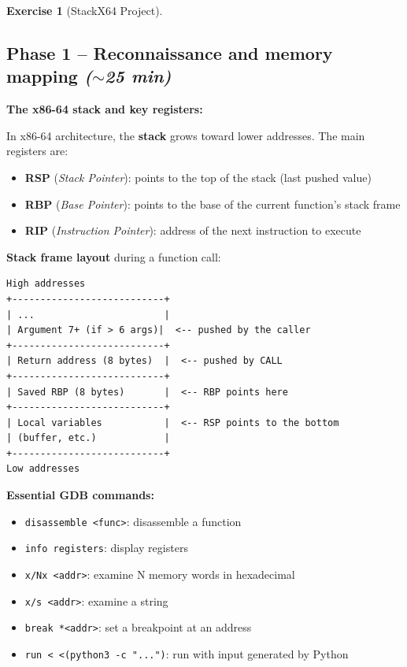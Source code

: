 \documentclass[a4paper,11pt]{article}
\theoremstyle{plain}
\theoremstyle{definition}
\newtheorem{exercice}{Exercise}
\begin{document}
\begin{exercice}[StackX64 Project]$\;$


\subsection*{Phase 1 -- Reconnaissance and memory mapping \hfill\normalfont\textit{($\sim$25 min)}}

\begin{rappel}
\textbf{The x86-64 stack and key registers:}

In x86-64 architecture, the \textbf{stack} grows toward lower addresses. The main registers are:
\begin{itemize}
    \item \textbf{RSP} (\textit{Stack Pointer}): points to the top of the stack (last pushed value)
    \item \textbf{RBP} (\textit{Base Pointer}): points to the base of the current function's stack frame
    \item \textbf{RIP} (\textit{Instruction Pointer}): address of the next instruction to execute
\end{itemize}

\medskip
\textbf{Stack frame layout} during a function call:
\begin{lstlisting}[style=GDBStyle]
High addresses
+---------------------------+
| ...                       |
| Argument 7+ (if > 6 args)|  <-- pushed by the caller
+---------------------------+
| Return address (8 bytes)  |  <-- pushed by CALL
+---------------------------+
| Saved RBP (8 bytes)       |  <-- RBP points here
+---------------------------+
| Local variables           |  <-- RSP points to the bottom
| (buffer, etc.)            |
+---------------------------+
Low addresses
\end{lstlisting}

\medskip
\textbf{Essential GDB commands:}
\begin{itemize}
    \item \texttt{disassemble <func>}: disassemble a function
    \item \texttt{info registers}: display registers
    \item \texttt{x/Nx <addr>}: examine N memory words in hexadecimal
    \item \texttt{x/s <addr>}: examine a string
    \item \texttt{break *<addr>}: set a breakpoint at an address
    \item \texttt{run < <(python3 -c "...")}: run with input generated by Python
\end{itemize}
\end{rappel}


\end{exercice}
\end{document}
